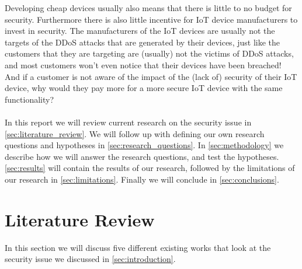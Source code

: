 \documentclass[a4paper,10pt]{article}
\begin{document}
Developing cheap devices usually also  means that there is little to no budget for 
security. Furthermore there is also little incentive for IoT device manufacturers to invest in security. The manufacturers 
of the IoT devices are usually not the targets of the DDoS attacks that are generated by their devices, just like the 
customers that they are targeting are (usually) not the victims of DDoS attacks, and most customers won't even notice
that their devices have been breached! And if a customer is not aware of the impact of the (lack of) security of their IoT device,
why would they pay more for a more secure IoT device with the same functionality?
\\\\
In this report we will review current research on the security issue in \autoref{sec:literature_review}. We will follow up with
defining our own research questions and hypotheses in \autoref{sec:research_questions}. In \autoref{sec:methodology} we
describe how we will answer the research questions, and test the hypotheses. \autoref{sec:results} will contain the results
of our research, followed by the limitations of our research in \autoref{sec:limitations}. Finally we will conclude in 
\autoref{sec:conclusions}.

\section{Literature Review} \label{sec:literature_review}
% 
In this section we will discuss five different existing works that look at the security issue we discussed in 
\autoref{sec:introduction}. 
\end{document}
